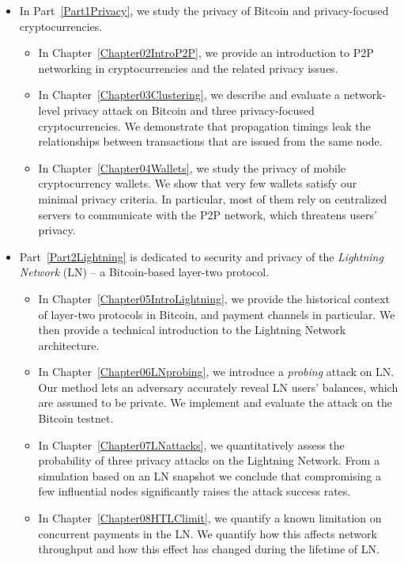 \begin{itemize}
	\item 
	In Part~\ref{Part1Privacy}, we study the privacy of Bitcoin and privacy-focused cryptocurrencies.
	\begin{itemize}
		\item
	In Chapter~\ref{Chapter02IntroP2P}, we provide an introduction to P2P networking in cryptocurrencies and the related privacy issues.
		\item
	In Chapter~\ref{Chapter03Clustering}, we describe and evaluate a network-level privacy attack on Bitcoin and three privacy-focused cryptocurrencies.
	We demonstrate that propagation timings leak the relationships between transactions that are issued from the same node.
		\item
	In Chapter~\ref{Chapter04Wallets}, we study the privacy of mobile cryptocurrency wallets.
	We show that very few wallets satisfy our minimal privacy criteria.
	In particular, most of them rely on centralized servers to communicate with the P2P network, which threatens users' privacy.
	\end{itemize}

	\item
	Part~\ref{Part2Lightning} is dedicated to security and privacy of the \textit{Lightning Network} (LN) -- a Bitcoin-based layer-two protocol.
	\begin{itemize}
		\item 
	In Chapter~\ref{Chapter05IntroLightning}, we provide the historical context of layer-two protocols in Bitcoin, and payment channels in particular.
	We then provide a technical introduction to the Lightning Network architecture.
		\item
	In Chapter~\ref{Chapter06LNprobing}, we introduce a \textit{probing} attack on LN.
	Our method lets an adversary accurately reveal LN users' balances, which are assumed to be private.
	We implement and evaluate the attack on the Bitcoin testnet.
		\item
	In Chapter~\ref{Chapter07LNattacks}, we quantitatively assess the probability of three privacy attacks on the Lightning Network.
	From a simulation based on an LN snapshot we conclude that compromising a few influential nodes significantly raises the attack success rates.
		\item
	In Chapter~\ref{Chapter08HTLClimit}, we quantify a known limitation on concurrent payments in the LN.
	We quantify how this affects network throughput and how this effect has changed during the lifetime of LN.
	\end{itemize}


\end{itemize}
